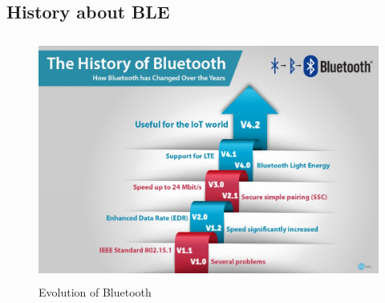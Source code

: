 \documentclass[11pt,a4paper]{article}
\begin{document}
	 \subsection{History about BLE}
	 \begin{figure}[h]
    \centering
    \includegraphics[width=15cm,height=8cm]{history.jpg}
    \caption{Evolution of Bluetooth}
    \end{figure}
\end{document}
